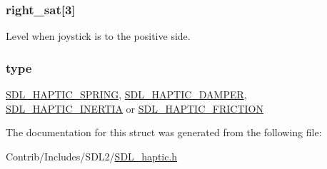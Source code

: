 \subsubsection[{\texorpdfstring{right\+\_\+sat}{right_sat}}]{ right\+\_\+sat\mbox{[}3\mbox{]}}\hypertarget{struct_s_d_l___haptic_condition_ac923a3cfe907fc31483f4103516bf280}{}\label{struct_s_d_l___haptic_condition_ac923a3cfe907fc31483f4103516bf280}
Level when joystick is to the positive side. 
\subsubsection[{\texorpdfstring{type}{type}}]{ type}\hypertarget{struct_s_d_l___haptic_condition_a8db4a3e9f29940892f2773bca31c74e1}{}\label{struct_s_d_l___haptic_condition_a8db4a3e9f29940892f2773bca31c74e1}
\hyperlink{_s_d_l__haptic_8h_a3b52d4700380085e2b5d87bb20320fb1}{S\+D\+L\+\_\+\+H\+A\+P\+T\+I\+C\+\_\+\+S\+P\+R\+I\+NG}, \hyperlink{_s_d_l__haptic_8h_a69522f261973e3ea4273486141320a87}{S\+D\+L\+\_\+\+H\+A\+P\+T\+I\+C\+\_\+\+D\+A\+M\+P\+ER}, \hyperlink{_s_d_l__haptic_8h_a14b807471589120395aec28293cf6642}{S\+D\+L\+\_\+\+H\+A\+P\+T\+I\+C\+\_\+\+I\+N\+E\+R\+T\+IA} or \hyperlink{_s_d_l__haptic_8h_a98a5011311168d63921aaac21403a4d8}{S\+D\+L\+\_\+\+H\+A\+P\+T\+I\+C\+\_\+\+F\+R\+I\+C\+T\+I\+ON} 

The documentation for this struct was generated from the following file\+:\begin{DoxyCompactItemize}
\item 
Contrib/\+Includes/\+S\+D\+L2/\hyperlink{_s_d_l__haptic_8h}{S\+D\+L\+\_\+haptic.\+h}\end{DoxyCompactItemize}
